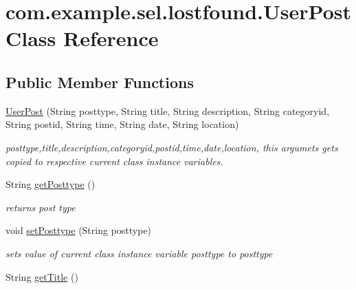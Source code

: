 \hypertarget{classcom_1_1example_1_1sel_1_1lostfound_1_1UserPost}{}\section{com.\+example.\+sel.\+lostfound.\+User\+Post Class Reference}
\label{classcom_1_1example_1_1sel_1_1lostfound_1_1UserPost}
\subsection*{Public Member Functions}
\begin{DoxyCompactItemize}
\item 
\hyperlink{classcom_1_1example_1_1sel_1_1lostfound_1_1UserPost_ad0a1545afc07c0bd11ee2e009c035931}{User\+Post} (String posttype, String title, String description, String categoryid, String postid, String time, String date, String location)
\begin{DoxyCompactList}\small\item\em posttype,title,description,categoryid,postid,time,date,location, this argumets gets copied to respective current class instance variables. \end{DoxyCompactList}\item 
String \hyperlink{classcom_1_1example_1_1sel_1_1lostfound_1_1UserPost_a8605b0fbdf58cd6805f0aaa0951da641}{get\+Posttype} ()\hypertarget{classcom_1_1example_1_1sel_1_1lostfound_1_1UserPost_a8605b0fbdf58cd6805f0aaa0951da641}{}\label{classcom_1_1example_1_1sel_1_1lostfound_1_1UserPost_a8605b0fbdf58cd6805f0aaa0951da641}

\begin{DoxyCompactList}\small\item\em returns post type \end{DoxyCompactList}\item 
void \hyperlink{classcom_1_1example_1_1sel_1_1lostfound_1_1UserPost_ad504c587f64281c1a47cc29ebb79a359}{set\+Posttype} (String posttype)\hypertarget{classcom_1_1example_1_1sel_1_1lostfound_1_1UserPost_ad504c587f64281c1a47cc29ebb79a359}{}\label{classcom_1_1example_1_1sel_1_1lostfound_1_1UserPost_ad504c587f64281c1a47cc29ebb79a359}

\begin{DoxyCompactList}\small\item\em sets value of current class instance variable posttype to posttype \end{DoxyCompactList}\item 
String \hyperlink{classcom_1_1example_1_1sel_1_1lostfound_1_1UserPost_a0d1d9e880acbaa4cfcc43dd22e215ec8}{get\+Title} ()\hypertarget{classcom_1_1example_1_1sel_1_1lostfound_1_1UserPost_a0d1d9e880acbaa4cfcc43dd22e215ec8}{}\label{classcom_1_1example_1_1sel_1_1lostfound_1_1UserPost_a0d1d9e880acbaa4cfcc43dd22e215ec8}


\end{DoxyCompactItemize}

